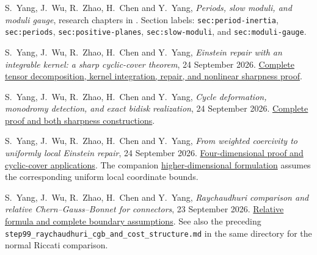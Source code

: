 \documentclass[11pt,a4paper]{article}
\theoremstyle{definition}\newtheorem{definition}[theorem]{Definition}
\theoremstyle{remark}\newtheorem{remark}[theorem]{Remark}
\newcommand{\repo}[2]{\href{https://github.com/Cherish0925/Geometric-Analysis/blob/main/#1}{#2}}
\begin{document}
\begin{thebibliography}{99}
S.~Yang, J.~Wu, R.~Zhao, H.~Chen and Y.~Yang, \emph{Periods, slow moduli, and moduli gauge}, research chapters in \cite{source-integrated}. Section labels: \texttt{sec:period-inertia}, \texttt{sec:periods}, \texttt{sec:positive-planes}, \texttt{sec:slow-moduli}, and \texttt{sec:moduli-gauge}.

S.~Yang, J.~Wu, R.~Zhao, H.~Chen and Y.~Yang, \emph{Einstein repair with an integrable kernel: a sharp cyclic-cover theorem}, 24 September 2026. \repo{research/packages/20261007_Einstein_Gaps_Two_Sessions--9d4f2de3/20261007_Einstein_Gaps_Two_Sessions/sources/Skills/geometric-analysis/research/sources/continuation/20260924_integrable_kernel_cyclic_repair.md}{Complete tensor decomposition, kernel integration, repair, and nonlinear sharpness proof}.

S.~Yang, J.~Wu, R.~Zhao, H.~Chen and Y.~Yang, \emph{Cycle deformation, monodromy detection, and exact bidisk realization}, 24 September 2026. \repo{research/packages/20261007_Einstein_Gaps_Two_Sessions--9d4f2de3/20261007_Einstein_Gaps_Two_Sessions/sources/Skills/geometric-analysis/research/sources/continuation/20260924_cycle_holonomy_realization.md}{Complete proof and both sharpness constructions}.

S.~Yang, J.~Wu, R.~Zhao, H.~Chen and Y.~Yang, \emph{From weighted coercivity to uniformly local Einstein repair}, 24 September 2026. \repo{research/packages/20261007_Einstein_Gaps_Two_Sessions--9d4f2de3/20261007_Einstein_Gaps_Two_Sessions/sources/Skills/geometric-analysis/research/sources/continuation/20260924_uniformly_local_repair.md}{Four-dimensional proof and cyclic-cover applications}. The companion \repo{research/packages/20261007_Einstein_Gaps_Two_Sessions--9d4f2de3/20261007_Einstein_Gaps_Two_Sessions/sources/Skills/geometric-analysis/research/sources/continuation/20260924_higher_dimensional_local_repair.md}{higher-dimensional formulation} assumes the corresponding uniform local coordinate bounds.

S.~Yang, J.~Wu, R.~Zhao, H.~Chen and Y.~Yang, \emph{Raychaudhuri comparison and relative Chern--Gauss--Bonnet for connectors}, 23 September 2026. \repo{research/packages/20261007_Einstein_Gaps_Two_Sessions--9d4f2de3/20261007_Einstein_Gaps_Two_Sessions/sources/Skills/geometric-analysis/research/sources/archive/sources/20260923/v08_S0910A03/workspace/notes/step100_relative_cgb_graph_budget.md}{Relative formula and complete boundary assumptions}. See also the preceding \texttt{step99\_raychaudhuri\_cgb\_and\_cost\_structure.md} in the same directory for the normal Riccati comparison.


\end{thebibliography}
\end{document}
